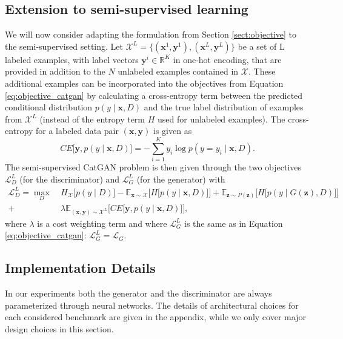 \documentclass{article} \usepackage{iclr2016_conference,times}
\newcommand{\bx}{\mathbf{x}}
\newcommand{\bz}{\mathbf{z}}
\newcommand{\by}{\mathbf{y}}
\begin{document}
\subsection{Extension to semi-supervised learning}
\label{sect:semi_supervised}
We will now consider adapting the formulation from Section
\ref{sect:objective} to the semi-supervised setting. Let
$\mathcal{X}^L = \lbrace (\bx^1, \by^1), (\bx^L, \by^L) \rbrace$ be a
set of L labeled examples, with label vectors $\by^i \in \mathbb{R}^K$
in one-hot encoding, that are provided in addition to the $N$
unlabeled examples contained in $\mathcal{X}$. These additional
examples can be incorporated into the objectives from Equation
\eqref{eq:objective_catgan} by calculating a cross-entropy term
between the predicted conditional distribution $p(y \mid \bx, D)$ and
the true label distribution of examples from $\mathcal{X}^L$ (instead
of the entropy term $H$ used for unlabeled examples). The
cross-entropy for a labeled data pair $(\bx, \by)$ is given as
\begin{equation}
      CE \big[ \by, p(y \mid \bx, D) \big] = - \sum^K_{i=1} y_i \log p(y = y_i \mid \bx, D).
\end{equation}
The semi-supervised CatGAN problem is then given through the two
objectives $\mathcal{L}^L_{D}$ (for the discriminator) and $\mathcal{L}^L_{G}$ (for the generator) with
\begin{equation}
\begin{aligned}
  \mathcal{L}^L_{D} = \max_{D} \ &H_{\mathcal{X}} \Big [ p( y \mid D ) \Big ] -  \mathbb{E}_{\bx \sim
                                \mathcal{X}} \Big[ H \big[ p(y
                                 \mid \bx, D) \big]  \Big] + \mathbb{E}_{\bz
    \sim P(\bz)} \Big[ H\big[ p(y \mid G(\bz), D) \big]  \Big] \\
   + &\lambda \mathbb{E}_{(\bx, \by) \sim \mathcal{X}^L} \Big[ CE \big[ \by,  p(y \mid \bx, D) \big]  \Big],
\label{eq:objective_ss_catgan}
\end{aligned}
\end{equation}
where $\lambda$ is a cost weighting term and where $\mathcal{L}^L_{G}$
is the same as in Equation \eqref{eq:objective_catgan}:
$\mathcal{L}^L_{G} = \mathcal{L}_{G}$.

\subsection{Implementation Details}
In our experiments both the generator and the discriminator are always
parameterized through neural networks. The details of architectural
choices for each considered benchmark are given in the appendix, while
we only cover major design choices in this section. 
\end{document}
